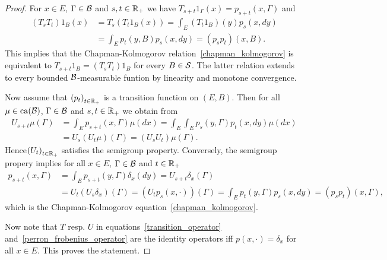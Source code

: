 \documentclass[../Master.tex]{subfiles}
\begin{document}
\begin{proof}
  For \(x \in E\), \(\Gamma \in \mathcal{B} \) and \(s,t \in \mathbb{R}_+ \) we have \(T_{s+t} 1_\Gamma (x) =  p_{s+t}(x, \Gamma)\) and
  \begin{equation*}
    \begin{aligned}
      (T_s T_t) 1_B(x) &= T_s(T_t 1_B(x)) = \int_E  (T_t 1_B)(y) p_s(x,dy) \\
      &= \int_E p_t(y,B) p_s (x,dy) = (p_s p_t) (x,B).
    \end{aligned}
  \end{equation*}
  This implies that the Chapman-Kolmogorov relation~\eqref{chapman_kolmogorov} is equivalent to \(T_{s+t} 1_B = (T_s T_t) 1_B\) for every \(B \in \mathcal{S} \). The latter relation extends to every bounded \(\mathcal{B}\)-measurable funtion by linearity and monotone convergence.
  
  Now assume that \({(p_t)}_{t \in \mathbb{R}_+}\) is a transition function on \((E,B)\). Then for all \(\mu \in \mathrm{ca}(\mathcal{B})\), \(\Gamma \in \mathcal{B}\) and \(s,t \in \mathbb{R}_+ \) we obtain from 
  \begin{equation*}
    \begin{aligned}
      U_{s+t} \mu(\Gamma) &= \int_E p_{s+t}(x,\Gamma) \mu(dx) = \int_E \int_E p_s(y,\Gamma) p_t(x, dy) \mu(dx) \\
      &= U_s(U_t \mu)(\Gamma) = (U_s U_t) \mu (\Gamma).
    \end{aligned}
  \end{equation*}
  Hence\({(U_t)}_{t \in \mathbb{R}_+}\) satisfies the semigroup property.
  Conversely, the semigroup propery implies for all \(x \in E\), \(\Gamma \in \mathcal{B}\) and \(t \in \mathbb{R}_+ \)
  \begin{equation*}
    \begin{aligned}
      p_{s+t} (x, \Gamma) &= \int_E p_{s+t}(y,\Gamma) \delta_x(dy) = U_{s+t} \delta_x(\Gamma) \\
      &= U_t (U_s \delta_x) (\Gamma) = (U_t p_s(x,\cdot))(\Gamma) = \int_E p_t (y, \Gamma) p_s(x, dy) = (p_s p_t)(x,\Gamma),
    \end{aligned}
  \end{equation*}
  which is the Chapman-Kolmogorov equation~\eqref{chapman_kolmogorov}.
  
  Now note that \(T\) resp. \(U\) in equations~\eqref{transition_operator} and~\eqref{perron_frobenius_operator} are the identity operators iff \(p(x, \cdot) = \delta_x \) for all \(x \in E\). This proves the statement.
\end{proof}
\end{document}
